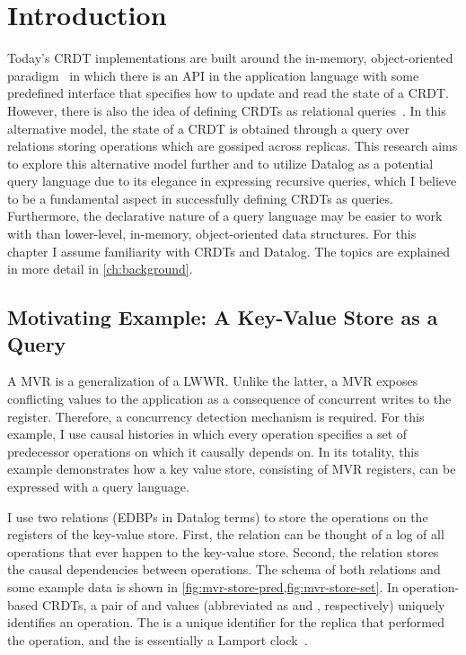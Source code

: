
\chapter{Introduction}\label{ch:intro}

Today's \ac{CRDT} implementations are built around the in-memory,
object-oriented paradigm~\cite{laddad2022keep} in which there is an API
in the application language with some predefined interface that
specifies how to update and read the state of a \ac{CRDT}.
However, there is also the idea of defining \acp{CRDT}
as relational queries~\cite{kleppmann2018data}.
In this alternative model, the state of a CRDT is obtained through a query over
relations storing operations which are gossiped across replicas.
This research aims to explore this alternative model further and
to utilize Datalog as a potential query language due to its elegance in
expressing recursive queries, which I believe to be a fundamental aspect in
successfully defining \acp{CRDT} as queries.
Furthermore, the declarative nature of a query language may be easier to work
with than lower-level, in-memory, object-oriented data structures.
For this chapter I assume familiarity with \acp{CRDT} and Datalog.
The topics are explained in more detail in \autoref{ch:background}.

\section{Motivating Example: A Key-Value Store as a Query}\label{sec:motivating-example}

A \ac{MVR} is a generalization of a \ac{LWWR}.
Unlike the latter, a \ac{MVR} exposes conflicting values to the application
as a consequence of concurrent writes to the register.
Therefore, a concurrency detection mechanism is required.
For this example, I use causal histories in which every operation specifies
a set of predecessor operations on which it causally depends on\footnotemark{}.
In its totality, this example demonstrates how a key value store,
consisting of MVR registers, can be expressed with a query language.


I use two relations (\acp{EDBP} in Datalog terms) to store the operations
on the registers of the key-value store.
First, the  relation can be thought of a log of all operations
that ever happen to the key-value store.
Second, the  relation stores the causal dependencies between operations.
The schema of both relations and some example data is shown in
\ref{fig:mvr-store-pred,fig:mvr-store-set}.
In operation-based \acp{CRDT}, a pair of  and  values
(abbreviated as  and , respectively) uniquely
identifies an operation.
The  is a unique identifier for the replica that performed the
operation, and the  is essentially a Lamport clock~\cite{lamport2019time}.

